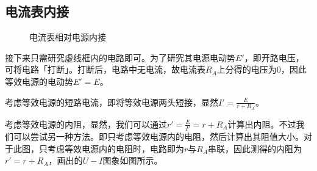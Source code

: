 \documentclass[UTF8,b5paper]{ctexart}
\newcommand{\dpm}[1]{$\displaystyle{#1}$}
\begin{document}
\subsection{电流表内接}
\begin{figure}[H]
  \centering
  \caption{电流表相对电源内接}
\end{figure}
接下来只需研究虚线框内的电路即可。为了研究其电源电动势$E'$，即开路电压，可将电路「打断」。打断后，电路中无电流，故电流表$R_A$上分得的电压为$0$，因此等效电源的电动势$E'=E$。

考虑等效电源的短路电流，即将等效电源两头短接，显然\dpm{I'=\frac E {r + R_A}}。

考虑等效电源的内阻，显然，我们可以通过\dpm{r' = \frac E {I'} = r + R_A}计算出内阻。不过我们可以尝试另一种方法。即只考虑等效电源内的电阻，然后计算出其阻值大小。对于此图，只考虑等效电源内的电阻时，电路即为$r$与$R_A$串联，因此测得的内阻为$r' = r + R_A$，画出的$U-I$图象如图所示。
\end{document}
